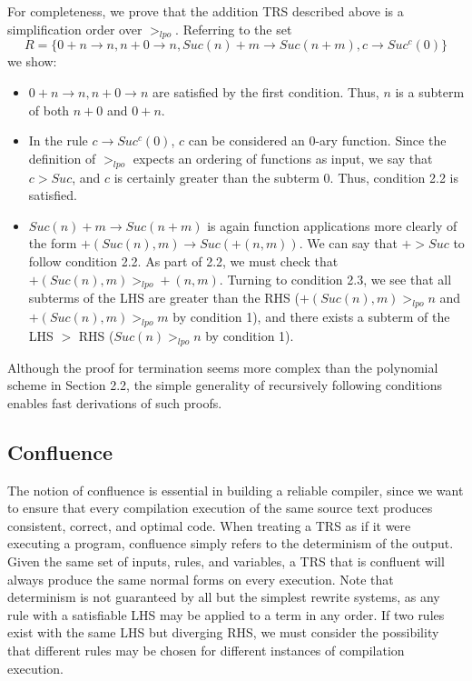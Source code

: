 \documentclass{article}
\begin{document}
For completeness, we prove that the addition TRS described above is a simplification order over $>_{lpo}$.
Referring to the set
\[R = \{0 + n \rightarrow n, n + 0 \rightarrow n, Suc(n) + m \rightarrow Suc(n+m), c \rightarrow Suc^c(0)\}\]
we show:
\begin{itemize}
    \item $0 + n \rightarrow n, n + 0 \rightarrow n$ are satisfied by the first condition. Thus, $n$ is a subterm of both $n+0$ and $0+n$.
    \item In the rule $c \rightarrow Suc^c(0)$, $c$ can be considered an 0-ary function. Since the definition of $>_{lpo}$
    expects an ordering of functions as input, we say that $c > Suc$, and $c$ is certainly greater than the subterm 0.
    Thus, condition 2.2 is satisfied.
    \item $Suc(n) + m \rightarrow Suc(n+m)$ is again function applications more clearly of the form $+(Suc(n), m) \rightarrow Suc(+(n,m))$.
    We can say that $+ > Suc$ to follow condition 2.2. As part of 2.2, we must check that $+(Suc(n), m) >_{lpo} +(n,m)$. Turning to condition 2.3,
    we see that all subterms of the LHS are greater than the RHS ($+(Suc(n), m) >_{lpo} n$ and $+(Suc(n), m) >_{lpo} m$ by condition 1),
    and there exists a subterm of the LHS $>$ RHS ($Suc(n) >_{lpo} n$ by condition 1).
\end{itemize}
Although the proof for termination seems more complex than the polynomial scheme in Section 2.2, the simple generality of recursively following conditions
enables fast derivations of such proofs.

\subsection{Confluence}
The notion of confluence is essential in building a reliable compiler, since we want to ensure that every
compilation execution of the same source text produces consistent, correct, and optimal code.
When treating a TRS as if it were executing a program, confluence simply refers to the determinism of the output.
Given the same set of inputs, rules, and variables, a TRS that is confluent will always produce the same normal forms
on every execution. Note that determinism is not guaranteed by all but the simplest rewrite systems, as any rule with a satisfiable LHS
may be applied to a term in any order. If two rules exist with the same LHS but diverging RHS, we must consider the possibility
that different rules may be chosen for different instances of compilation execution.
\end{document}
